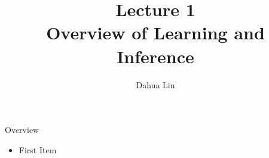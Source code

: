 \documentclass{beamer}
\begin{document}
\title[Lec 1]{Lecture 1 \\ Overview of Learning and Inference}
\author[D. Lin]{Dahua Lin}
\date{}
\frame{\titlepage}


\section{}

\begin{frame}{Overview}
\begin{itemize}
\item First Item
\end{itemize}
\end{frame}
\end{document}
